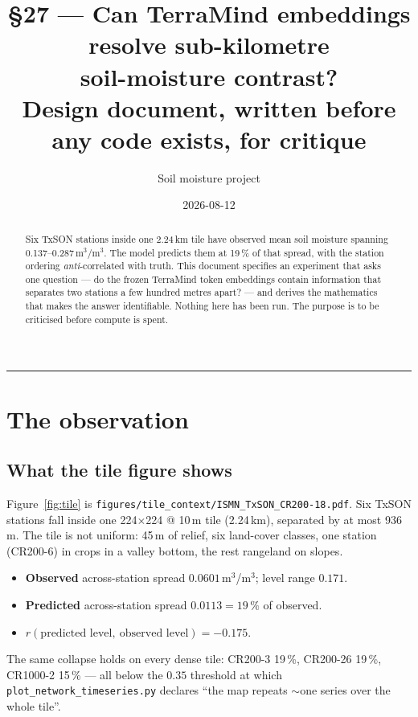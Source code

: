 \documentclass[11pt,a4paper]{article}
\title{\S27 --- Can TerraMind embeddings resolve sub-kilometre\\soil-moisture contrast?\\[2mm]
\large Design document, written before any code exists, for critique}
\author{Soil moisture project}
\date{2026-08-12}
\begin{document}
\maketitle

\begin{abstract}
\noindent
Six TxSON stations inside one 2.24\,km tile have observed mean soil moisture spanning
0.137--0.287\,m$^3$/m$^3$. The model predicts them at 19\,\% of that spread, with the
station ordering \emph{anti}-correlated with truth. This document specifies an experiment
that asks one question --- do the frozen TerraMind token embeddings contain information
that separates two stations a few hundred metres apart? --- and derives the mathematics
that makes the answer identifiable. Nothing here has been run. The purpose is to be
criticised before compute is spent.
\end{abstract}

\tableofcontents
\bigskip\hrule

\section{The observation}

\subsection{What the tile figure shows}

Figure~\ref{fig:tile} is \verb|figures/tile_context/ISMN_TxSON_CR200-18.pdf|. Six TxSON
stations fall inside one 224$\times$224 @ 10\,m tile (2.24\,km), separated by at most
936\,m. The tile is not uniform: 45\,m of relief, six land-cover classes, one station
(CR200-6) in crops in a valley bottom, the rest rangeland on slopes.

\begin{itemize}[nosep]
  \item \textbf{Observed} across-station spread $0.0601$\,m$^3$/m$^3$; level range $0.171$.
  \item \textbf{Predicted} across-station spread $0.0113 = 19\,\%$ of observed.
  \item $r(\text{predicted level},\ \text{observed level}) = -0.175$.
\end{itemize}

The same collapse holds on every dense tile: CR200-3 19\,\%, CR200-26 19\,\%,
CR1000-2 15\,\% --- all below the $0.35$ threshold at which
\verb|plot_network_timeseries.py| declares ``the map repeats $\sim$one series over the
whole tile''.
\end{document}
